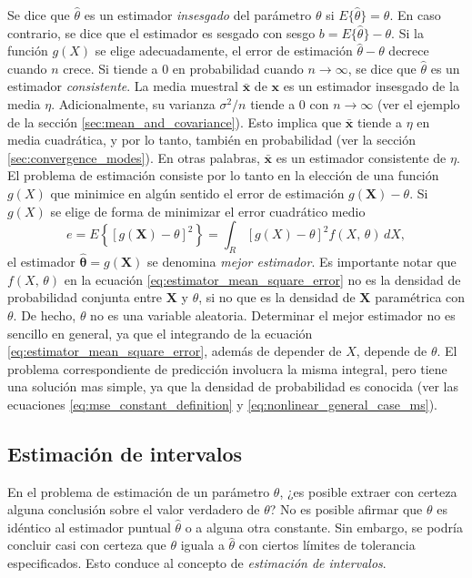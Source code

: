\documentclass[a4paper]{report}
\newcommand{\X}{\mathbf{X}}
\newcommand{\x}{\mathbf{x}}
\newcommand{\thetabf}{\bm{\theta}}
\begin{document}
Se dice que \(\hat{\theta}\) es un estimador \emph{insesgado} del parámetro \(\theta\) si \(E\{\hat{\theta}\}=\theta\). En caso contrario, se dice que el estimador es sesgado con sesgo \(b=E\{\hat{\theta}\}-\theta\). Si la función \(g(X)\) se elige adecuadamente, el error de estimación \(\hat{\theta}-\theta\) decrece cuando \(n\) crece. Si tiende a 0 en probabilidad cuando \(n\to\infty\), se dice que \(\hat{\theta}\) es un estimador \emph{consistente}. La media muestral \(\bar{\x}\) de \(\x\) es un estimador insesgado de la media \(\eta\). Adicionalmente, su varianza \(\sigma^2/n\) tiende a 0 con \(n\to\infty\) (ver el ejemplo de la sección \ref{sec:mean_and_covariance}). Esto implica que \(\bar{\x}\) tiende a \(\eta\) en media cuadrática, y por lo tanto, también en probabilidad (ver la sección \ref{sec:convergence_modes}). En otras palabras, \(\bar{\x}\) es un estimador consistente de \(\eta\). El problema de estimación consiste por lo tanto en la elección de una función \(g(X)\) que minimice en algún sentido el error de estimación \(g(\X)-\theta\). Si \(g(X)\) se elige de forma de minimizar el error cuadrático medio
\begin{equation}\label{eq:estimator_mean_square_error}
 e=E\left\{[g(\X)-\theta]^2\right\}=\int_{R}[g(X)-\theta]^2f(X,\,\theta)\,dX,
\end{equation}
el estimador \(\hat{\thetabf}=g(\X)\) se denomina \emph{mejor estimador}. Es importante notar que \(f(X,\,\theta)\) en la ecuación \ref{eq:estimator_mean_square_error} no es la densidad de probabilidad conjunta entre \(\X\) y \(\theta\), si no que es la densidad de \(\X\) paramétrica con \(\theta\). De hecho, \(\theta\) no es una variable aleatoria. Determinar el mejor estimador no es sencillo en general, ya que el integrando de la ecuación \ref{eq:estimator_mean_square_error}, además de depender de \(X\), depende de \(\theta\). El problema correspondiente de predicción involucra la misma integral, pero tiene una solución mas simple, ya que la densidad de probabilidad es conocida (ver las ecuaciones \ref{eq:mse_constant_definition} y \ref{eq:nonlinear_general_case_ms}).

\subsection{Estimación de intervalos}

En el problema de estimación de un parámetro \(\theta\), ¿es posible extraer con certeza alguna conclusión sobre el valor verdadero de \(\theta\)? No es posible afirmar que \(\theta\) es idéntico al estimador puntual \(\hat{\theta}\) o a alguna otra constante. Sin embargo, se podría concluir casi con certeza que \(\theta\) iguala a \(\hat{\theta}\) con ciertos límites de tolerancia especificados. Esto conduce al concepto de \emph{estimación de intervalos}. 
\end{document}
